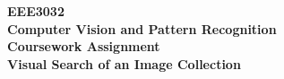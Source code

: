 




	
\hypersetup{pageanchor=false} %

	
\begin{titlepage}
	\centering
	{\huge\bfseries EEE3032 \\
	Computer Vision and Pattern Recognition \\
	Coursework Assignment \\
	\vspace{0.5cm}
	\Huge Visual Search of an Image Collection \par}
	\vspace{1cm}
	

\end{titlepage}
